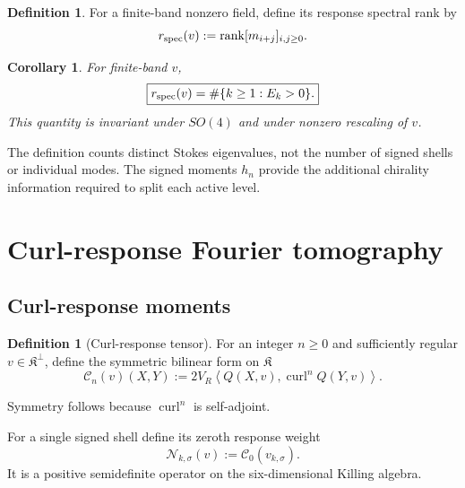 \documentclass[
 aps,
 prd,
 reprint,
 amsmath,
 amssymb,
 nofootinbib,
 superscriptaddress
]{revtex4-2}
\newtheorem{corollary}[theorem]{Corollary}
\theoremstyle{definition}
\newtheorem{definition}[theorem]{Definition}
\theoremstyle{remark}
\newcommand{\cK}{\mathfrak K}
\newcommand{\cC}{\mathscr C}
\newcommand{\cN}{\mathscr N}
\newcommand{\curl}{\operatorname{curl}}
\begin{document}
\begin{definition}
For a finite-band nonzero field, define its response spectral rank by
\begin{equation}
 r_{\rm spec}(v)
 :=
 \operatorname{rank}
 [m_{i+j}]_{i,j\ge0}.
 \label{R:hi:eq:rspec}
\end{equation}
\end{definition}

\begin{corollary}
For finite-band $v$,
\begin{equation}
 \boxed{
 r_{\rm spec}(v)
 =
 \#\{k\ge1:E_k>0\}.
 }
 \label{R:hi:eq:rspeclevels}
\end{equation}
This quantity is invariant under $SO(4)$ and under nonzero rescaling of
$v$.
\end{corollary}

The definition counts distinct Stokes eigenvalues, not the number of signed
shells or individual modes.  The signed moments $h_n$ provide the additional
chirality information required to split each active level.


\section{Curl-response Fourier tomography}

\subsection{Curl-response moments}

\begin{definition}[Curl-response tensor]
For an integer $n\ge0$ and sufficiently regular
$v\in\cK^\perp$, define the symmetric bilinear form on $\cK$
\begin{equation}
 \boxed{
 \cC_n(v)(X,Y)
 :=
 2V_R
 \left\langle
 Q(X,v),
 \curl^n Q(Y,v)
 \right\rangle.
 }
 \label{R:cf:eq:Cn}
\end{equation}
\end{definition}

Symmetry follows because $\curl^n$ is self-adjoint.

For a single signed shell define its zeroth response weight
\begin{equation}
 \cN_{k,\sigma}(v)
 :=
 \cC_0(v_{k,\sigma}).
 \label{R:cf:eq:Nks}
\end{equation}
It is a positive semidefinite operator on the six-dimensional Killing
algebra.
\end{document}
